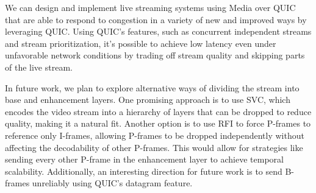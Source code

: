 We can design and implement live streaming systems using Media over QUIC that are able to respond to congestion in a variety of new and improved ways by leveraging QUIC. Using QUIC's features, such as concurrent independent streams and stream prioritization, it's possible to achieve low latency even under unfavorable network conditions by trading off stream quality and skipping parts of the live stream.

In future work, we plan to explore alternative ways of dividing the stream into base and enhancement layers. One promising approach is to use \ac{SVC}, which encodes the video stream into a hierarchy of layers that can be dropped to reduce quality, making it a natural fit. Another option is to use \ac{RFI} to force P-frames to reference only I-frames, allowing P-frames to be dropped independently without affecting the decodability of other P-frames. This would allow for strategies like sending every other P-frame in the enhancement layer to achieve temporal scalability. Additionally, an interesting direction for future work is to send B-frames unreliably using QUIC's datagram feature.